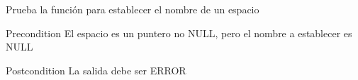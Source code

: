 \begin{DoxyRefList}
\item[\label{test__test000005}%
\hypertarget{test__test000005}{}%
Member \hyperlink{space__test_8h_aa24a337830006e33706ab6ac1c416b47}{test3\+\_\+space\+\_\+set\+\_\+name} ()]Prueba la función para establecer el nombre de un espacio \begin{DoxyPrecond}{Precondition}
El espacio es un puntero no N\+U\+L\+L, pero el nombre a establecer es N\+U\+L\+L 
\end{DoxyPrecond}
\begin{DoxyPostcond}{Postcondition}
La salida debe ser E\+R\+R\+O\+R 
\end{DoxyPostcond}

\end{DoxyRefList}